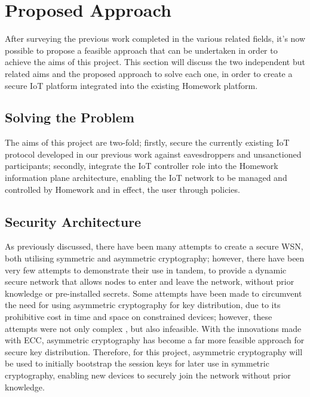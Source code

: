 \documentclass{mprop}
\begin{document}
\section{Proposed Approach}

After surveying the previous work completed in the various related fields, it's now possible to propose a feasible approach that can be undertaken in order to achieve the aims of this project. This section will discuss the two independent but related aims and the proposed approach to solve each one, in order to create a secure IoT platform integrated into the existing Homework platform.


\subsection{Solving the Problem} %
\label{sub:solving_the_problem}
The aims of this project are two-fold; firstly, secure the currently existing IoT protocol developed in our previous work against eavesdroppers and unsanctioned participants; secondly, integrate the IoT controller role into the Homework information plane architecture, enabling the IoT network to be managed and controlled by Homework and in effect, the user through policies.

\subsection{Security Architecture} %
\label{sub:security_architecture}
As previously discussed, there have been many attempts to create a secure WSN, both utilising symmetric and asymmetric cryptography; however, there have been very few attempts to demonstrate their use in tandem, to provide a dynamic secure network that allows nodes to enter and leave the network, without prior knowledge or pre-installed secrets. Some attempts have been made to circumvent the need for using asymmetric cryptography for key distribution, due to its prohibitive cost in time and space on constrained devices; however, these attempts were not only complex \cite{TinyPK}, but also infeasible\cite{MessageBottle}. With the innovations made with ECC, asymmetric cryptography has become a far more feasible approach for secure key distribution. Therefore, for this project, asymmetric cryptography will be used to initially bootstrap the session keys for later use in symmetric cryptography, enabling new devices to securely join the network without prior knowledge.
\end{document}

